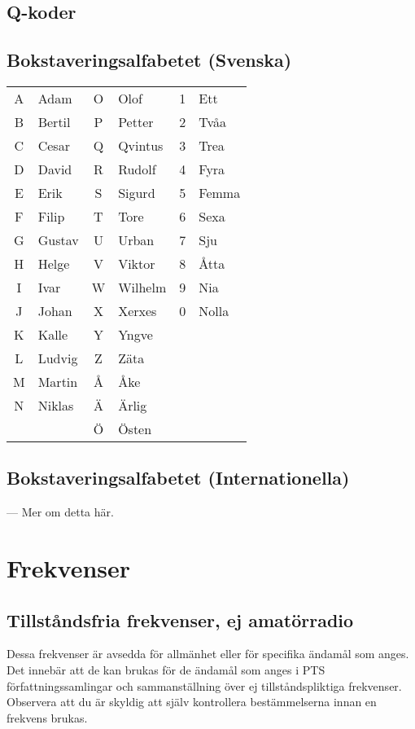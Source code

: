 \documentclass[12pt,swedish,a4paper]{article}
\begin{document}
\subsection{Q-koder}

\subsection{Bokstaveringsalfabetet (Svenska)}

\begin{tabular}{cl|cl|cl }
	A & Adam   & O & Olof    & 1 & Ett \\
	B & Bertil & P & Petter  & 2 & Tvåa \\
	C & Cesar  & Q & Qvintus & 3 & Trea \\
	D & David  & R & Rudolf  & 4 & Fyra \\
	E & Erik   & S & Sigurd  & 5 & Femma \\
	F & Filip  & T & Tore    & 6 & Sexa \\
	G & Gustav & U & Urban   & 7 & Sju \\
	H & Helge  & V & Viktor  & 8 & Åtta \\
	I & Ivar   & W & Wilhelm & 9 & Nia \\
	J & Johan  & X & Xerxes  & 0 & Nolla \\
	K & Kalle  & Y & Yngve   &   &  \\
	L & Ludvig & Z & Zäta    &   &  \\
	M & Martin & Å & Åke     &   &  \\
	N & Niklas & Ä & Ärlig   &   &  \\
	  &        & Ö & Östen   &   &
\end{tabular}

\subsection{Bokstaveringsalfabetet (Internationella)}

--- Mer om detta här.

\section{Frekvenser}

\subsection{Tillståndsfria frekvenser, ej amatörradio}

Dessa frekvenser är avsedda för allmänhet eller för specifika ändamål som anges. Det innebär att de kan brukas för de ändamål som anges i PTS författningssamlingar och sammanställning över ej tillståndspliktiga frekvenser. Observera att du är skyldig att själv kontrollera bestämmelserna innan en frekvens brukas.
\end{document}
